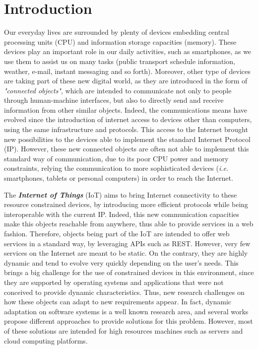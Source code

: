 \chapter{Introduction}
\label{ch:introduction}
Our everyday lives are surrounded by plenty of devices embedding central processing units (CPU) and information storage capacities (memory).
These devices play an important role in our daily activities, such as smartphones\cite{sarwar2013impact}, as we use them to assist us on many tasks (public transport schedule information, weather, e-mail, instant messaging and so forth).
Moreover, other type of devices are taking part of these new digital world, as they are introduced in the form of \textit{"connected objects"}, which are intended to communicate not only to people through human-machine interfaces, but also to directly send and receive information from other similar objects.
Indeed, the communications means have evolved since the introduction of internet access to devices other than computers, using the same infrastructure and protocols.
This access to the Internet brought new possibilities to the devices able to implement the standard Internet Protocol (IP).
However, these new connected objects are often not able to implement this standard way of communication, due to its poor CPU power and memory constraints, relying the communication to more sophisticated devices (\textit{i.e.} smartphones, tablets or personal computers) in order to reach the Internet.

The \textbf{\textit{Internet of Things}} (IoT) aims to bring Internet connectivity to these resource constrained devices, by introducing more efficient protocols while being interoperable with the current IP.
Indeed, this new communication capacities make this objects reachable from anywhere, thus able to provide services in a web fashion.
Therefore, objects being part of the IoT are intended to offer web services in a standard way, by leveraging APIs such as REST\cite{Fielding02REST}.
However, very few services on the Internet are meant to be static.
On the contrary, they are highly dynamic and tend to evolve very quickly depending on the user's needs.
This brings a big challenge for the use of constrained devices in this environment, since they are supported by operating systems and applications that were not conceived to provide dynamic characteristics.
Thus, new research challenges on how these objects can adapt to new requirements appear.
In fact, dynamic adaptation on software systems is a well known research area, and several works propose different approaches to provide solutions for this problem.
However, most of these solutions are intended for high resources machines such as servers and cloud computing platforms.


